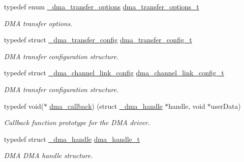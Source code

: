 \begin{DoxyCompactItemize}
\mbox{\label{group__dma_gaec24ca8cd376da34bb30fc7d8f32853b}} 
typedef enum \mbox{\hyperlink{group__dma_ga1497caa1db3c7b45b95f6c8658167fe1}{\+\_\+dma\+\_\+transfer\+\_\+options}} \mbox{\hyperlink{group__dma_gaec24ca8cd376da34bb30fc7d8f32853b}{dma\+\_\+transfer\+\_\+options\+\_\+t}}
\begin{DoxyCompactList}\small\item\em D\+MA transfer options. \end{DoxyCompactList}\item 
\mbox{\label{group__dma_gadb6e4baf9efcf14a889babc34d6f0d80}} 
typedef struct \mbox{\hyperlink{struct__dma__transfer__config}{\+\_\+dma\+\_\+transfer\+\_\+config}} \mbox{\hyperlink{group__dma_gadb6e4baf9efcf14a889babc34d6f0d80}{dma\+\_\+transfer\+\_\+config\+\_\+t}}
\begin{DoxyCompactList}\small\item\em D\+MA transfer configuration structure. \end{DoxyCompactList}\item 
\mbox{\label{group__dma_ga5076c6be0136d122ef46374dc1eadb0d}} 
typedef struct \mbox{\hyperlink{struct__dma__channel__link__config}{\+\_\+dma\+\_\+channel\+\_\+link\+\_\+config}} \mbox{\hyperlink{group__dma_ga5076c6be0136d122ef46374dc1eadb0d}{dma\+\_\+channel\+\_\+link\+\_\+config\+\_\+t}}
\begin{DoxyCompactList}\small\item\em D\+MA transfer configuration structure. \end{DoxyCompactList}\item 
\mbox{\label{group__dma_gab03f33ad69a5875d025f941419247123}} 
typedef void($\ast$ \mbox{\hyperlink{group__dma_gab03f33ad69a5875d025f941419247123}{dma\+\_\+callback}}) (struct \mbox{\hyperlink{struct__dma__handle}{\+\_\+dma\+\_\+handle}} $\ast$handle, void $\ast$user\+Data)
\begin{DoxyCompactList}\small\item\em Callback function prototype for the D\+MA driver. \end{DoxyCompactList}\item 
\mbox{\label{group__dma_gac4a65788d7e5762d16a41a50b2cd7956}} 
typedef struct \mbox{\hyperlink{struct__dma__handle}{\+\_\+dma\+\_\+handle}} \mbox{\hyperlink{group__dma_gac4a65788d7e5762d16a41a50b2cd7956}{dma\+\_\+handle\+\_\+t}}
\begin{DoxyCompactList}\small\item\em D\+MA D\+MA handle structure. \end{DoxyCompactList}\end{DoxyCompactItemize}
